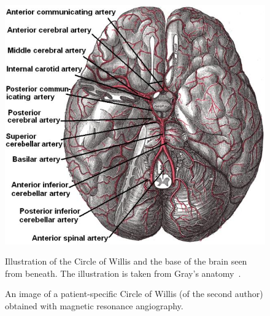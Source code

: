\begin{figure}
  \begin{center}
    \includegraphics[width=\largefig]{chapters/kvs-2/png/cow_gray_1.png} \\
  \end{center}
  \caption{Illustration of the Circle of Willis and the base of the brain
      seen from beneath. The illustration is  taken from Gray's anatomy~\citep{Gray1897}.}
  \label{fig:kvs-2:textbook-circle}
\end{figure}

\begin{figure}
  \begin{center}
  \end{center}
  \caption{An image of a patient-specific Circle of Willis (of the second author) obtained with magnetic resonance angiography.}
  \label{fig:kvs-2:circle_kent}
\end{figure}


